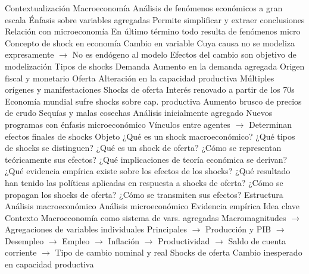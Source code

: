\documentclass{nuevotema}
\begin{document}
\esquemalargo















\begin{esquemal}
	\1[] 
		\2 Contextualización
			\3 Macroeconomía
				\4 Análisis de fenómenos económicos a gran escala
				\4 Énfasis sobre variables agregadas
				\4[] Permite simplificar y extraer conclusiones
				\4 Relación con microeconomía
				\4[] En último término todo resulta de fenómenos micro
			\3 Concepto de shock en economía
				\4 Cambio en variable
				\4[] Cuya causa no se modeliza expresamente
				\4[] $\to$ No es endógeno al modelo
				\4 Efectos del cambio son objetivo de modelización
			\3 Tipos de shocks
				\4 Demanda
				\4[] Aumento en la demanda agregada
				\4[] Origen fiscal y monetario
				\4 Oferta
				\4[] Alteración en la capacidad productiva
				\4[] Múltiples orígenes y manifestaciones
			\3 Shocks de oferta
				\4 Interés renovado a partir de los 70s
				\4 Economía mundial sufre shocks sobre cap. productiva
				\4[] Aumento brusco de precios de crudo
				\4[] Sequías y malas cosechas
				\4 Análisis inicialmente agregado
				\4 Nuevos programas con énfasis microeconómico
				\4[] Vínculos entre agentes
				\4[] $\to$ Determinan efectos finales de shocks
		\2 Objeto
			\3 ¿Qué es un shock macroeconómico?
			\3 ¿Qué tipos de shocks se distinguen?
			\3 ¿Qué es un shock de oferta?
			\3 ¿Cómo se representan teóricamente sus efectos?
			\3 ¿Qué implicaciones de teoría económica se derivan?
			\3 ¿Qué evidencia empírica existe sobre los efectos de los shocks?
			\3 ¿Qué resultado han tenido las políticas aplicadas en respuesta a shocks de oferta?
			\3 ¿Cómo se propagan los shocks de oferta?
			\3 ¿Cómo se transmiten sus efectos?
		\2 Estructura
			\3 Análisis macroeconómico
			\3 Análisis microeconómico
			\3 Evidencia empírica
	\1 
		\2 Idea clave
			\3 Contexto
				\4 Macroeconomía como sistema de vars. agregadas
				\4[] Macromagnitudes
				\4[] $\to$ Agregaciones de variables individuales
				\4[] Principales
				\4[] $\to$ Producción y PIB
				\4[] $\to$ Desempleo
				\4[] $\to$ Empleo
				\4[] $\to$ Inflación
				\4[] $\to$ Productividad
				\4[] $\to$ Saldo de cuenta corriente
				\4[] $\to$ Tipo de cambio nominal y real
				\4 Shocks de oferta
				\4[] Cambio inesperado en capacidad productiva

\end{esquemal}
\end{document}
